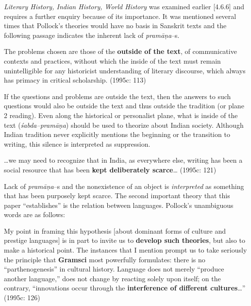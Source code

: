 {{\textit{Literary History, Indian History, World History }was examined earlier [4.6.6] and requires a further enquiry because of its importance. It was mentioned several times that Pollock’s theories would have no basis in Sanskrit texts and the following passage indicates the inherent lack of \textit{pramāṇa}–s.

\begin{myquote}
The problems chosen are those of the \textbf{outside of the text}, of communicative contexts and practices, without which the inside of the text must remain unintelligible for any historicist understanding of literary discourse, which always has primacy in critical scholarship. (1995c: 113)
\end{myquote}

If the questions and problems are outside the text, then the answers to such questions would also be outside the text and thus outside the tradition (or plane 2 reading). Even along the historical or personalist plane, what is inside of the text (\textit{śabda–pramāṇa}) should be used to theorize about Indian society. Although Indian tradition never explicitly mentions the beginning or the transition to writing, this silence is interpreted as suppression.

\begin{myquote}
…we may need to recognize that in India, as everywhere else, writing has been a social resource that has been \textbf{kept deliberately scarce}… (1995c: 121)
\end{myquote}

Lack of \textit{pramāṇa}–s and the nonexistence of an object is \textit{interpreted} as something that has been purposely kept scarce. The second important theory that this paper “establishes” is the relation between languages. Pollock’s unambiguous words are as follows:

\begin{myquote}
My point in framing this hypothesis [about dominant forms of culture and prestige languages] is in part to invite us to \textbf{develop such theories}, but also to make a historical point. The instances that I mention prompt us to take seriously the principle that\textbf{ Gramsci }most powerfully formulates: there is no “parthenogenesis” in cultural history. Language does not merely “produce another language,” does not change by reacting solely upon itself; on the contrary, “innovations occur through the \textbf{interference of different cultures}…” (1995c: 126)
\end{myquote}

}}
